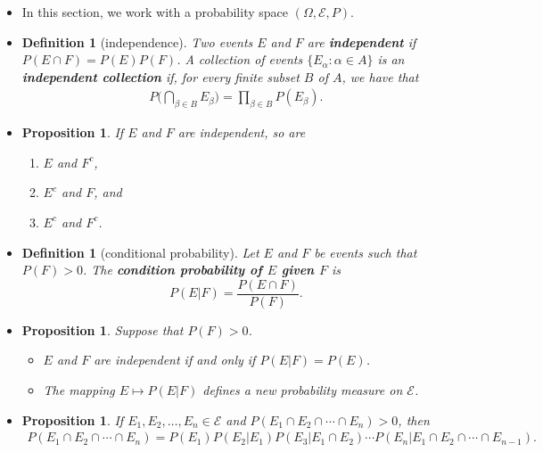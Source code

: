 \documentclass[10pt]{article}
\newtheorem{definition}[lemma]{Definition}
\newtheorem{proposition}[lemma]{Proposition}
\numberwithin{lemma}{section}
\newcommand{\mcal}[1]{\mathcal{#1}}
\begin{document}
\begin{itemize}
  \item In this section, we work with a probability space $(\Omega, \mcal{E}, P)$.
  
  \item \begin{definition}[independence]
    Two events $E$ and $F$ are {\bf independent} if $P(E \cap F) = P(E) P(F)$. A collection of events $\{ E_\alpha : \alpha \in A \}$ is an {\bf independent collection} if, for every finite subset $B$ of $A$, we have that
    \begin{align*}
      P \bigg( \bigcap_{\beta \in B} E_\beta \bigg) = \prod_{\beta \in B} P(E_\beta).
    \end{align*} 
  \end{definition}

  \item \begin{proposition}
    If $E$ and $F$ are independent, so are 
    \begin{enumerate}
      \item $E$ and $F^c$, 
      \item $E^c$ and $F$, and 
      \item$E^c$ and $F^c$.
    \end{enumerate}
  \end{proposition}

  \item \begin{definition}[conditional probability]
    Let $E$ and $F$ be events such that $P(F) > 0$. The {\bf condition probability of $E$ given $F$} is $$P(E|F) = \frac{P(E \cap F)}{P(F)}.$$
  \end{definition}

  \item \begin{proposition}
    Suppose that $P(F) > 0$.
    \begin{itemize}
      \item $E$ and $F$ are independent if and only if $P(E|F) = P(E)$.
      \item The mapping $E \mapsto P(E|F)$ defines a new probability measure on $\mcal{E}$. 
    \end{itemize}
  \end{proposition}

  \item \begin{proposition}
    If $E_1, E_2, \dotsc, E_n \in \mcal{E}$ and $P(E_1 \cap E_2 \cap \dotsb \cap E_n) > 0$, then
    \begin{align*}
      P(E_1 \cap E_2 \cap \dotsb \cap E_n) = P(E_1) P(E_2 | E_1) P(E_3 | E_1 \cap E_2) \dotsm P(E_n | E_1 \cap E_2 \cap \dotsb \cap E_{n-1}).
    \end{align*}
  \end{proposition}


\end{itemize}
\end{document}
